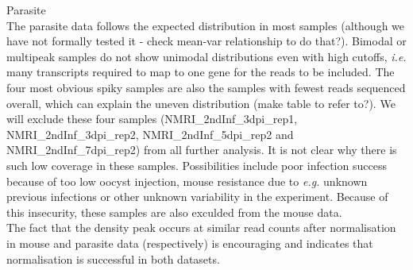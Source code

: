 \documentclass{article}
\begin{document}
Parasite\\
The parasite data follows the expected distribution in most samples
(although we have not formally tested it - check mean-var relationship
to do that?). Bimodal or multipeak samples do not show unimodal
distributions even with high cutoffs, \textit{i.e.} many transcripts
required to map to one gene for the reads to be included. The four
most obvious spiky samples are also the samples with fewest reads
sequenced overall, which can explain the uneven distribution (make
table to refer to?). We will exclude these four samples
(NMRI\_2ndInf\_3dpi\_rep1, NMRI\_2ndInf\_3dpi\_rep2,
NMRI\_2ndInf\_5dpi\_rep2 and NMRI\_2ndInf\_7dpi\_rep2) from all
further analysis. It is not clear why there is such low coverage in
these samples. Possibilities include poor infection success because of
too low oocyst injection, mouse resistance due to \textit{e.g.}
unknown previous infections or other unknown variability in the
experiment. Because of this insecurity, these samples are also
exculded from the mouse data.\\

The fact that the density peak occurs at similar read counts after
normalisation in mouse and parasite data (respectively) is encouraging
and indicates that normalisation is successful in both datasets.




\end{document}
